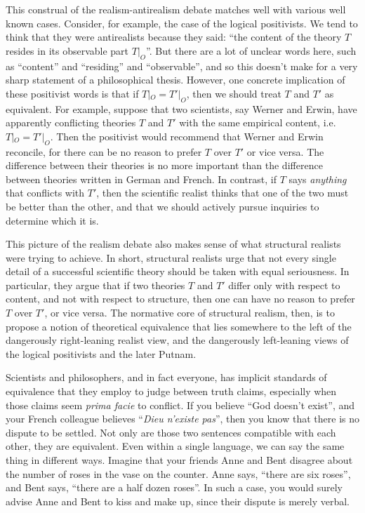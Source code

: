This construal of the realism-antirealism debate matches well with
various well known cases.  Consider, for example, the case of the
logical positivists.  We tend to think that they were antirealists
because they said: ``the content of the theory $T$ resides in its
observable part $T|_O$''.  But there are a lot of unclear words here,
such as ``content'' and ``residing'' and ``observable'', and so this
doesn't make for a very sharp statement of a philosophical thesis.
However, one concrete implication of these positivist words is that if
$T|_O=T'|_O$, then we should treat $T$ and $T'$ as equivalent.  For
example, suppose that two scientists, say Werner and Erwin, have
apparently conflicting theories $T$ and $T'$ with the same empirical
content, i.e.\ $T|_O=T'|_O$.  Then the positivist would recommend that
Werner and Erwin reconcile, for there can be no reason to prefer $T$
over $T'$ or vice versa.  The difference between their theories is no
more important than the difference between theories written in German
and French.  In contrast, if $T$ says {\it anything} that conflicts
with $T'$, then the scientific realist thinks that one of the two must
be better than the other, and that we should actively pursue inquiries
to determine which it is.

This picture of the realism debate also makes sense of what structural
realists were trying to achieve.  In short, structural realists urge
that not every single detail of a successful scientific theory should
be taken with equal seriousness.  In particular, they argue that if
two theories $T$ and $T'$ differ only with respect to content, and not
with respect to structure, then one can have no reason to prefer $T$
over $T'$, or vice versa.  The normative core of structural realism,
then, is to propose a notion of theoretical equivalence that lies
somewhere to the left of the dangerously right-leaning realist view,
and the dangerously left-leaning views of the logical positivists and
the later Putnam.

Scientists and philosophers, and in fact everyone, has implicit
standards of equivalence that they employ to judge between truth
claims, especially when those claims seem {\it prima facie} to
conflict.  If you believe ``God doesn't exist'', and your French
colleague believes ``{\it Dieu n'existe pas}'', then you know that
there is no dispute to be settled.  Not only are those two sentences
compatible with each other, they are equivalent.  Even within a single
language, we can say the same thing in different ways.  Imagine that
your friends Anne and Bent disagree about the number of roses in the
vase on the counter.  Anne says, ``there are six roses'', and Bent
says, ``there are a half dozen roses''.  In such a case, you would
surely advise Anne and Bent to kiss and make up, since their dispute
is merely verbal.

